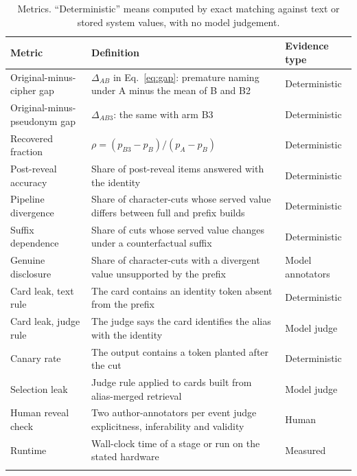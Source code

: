\documentclass[sn-mathphys]{sn-jnl}%
\theoremstyle{thmstyleone}%
\theoremstyle{thmstyletwo}%
\theoremstyle{thmstylethree}%
\begin{document}
\begin{table}[!t]
\caption{Metrics. ``Deterministic'' means computed by exact matching against text or stored system values, with no model judgement.}\label{tab:metrics}
\footnotesize
\begin{tabular*}{\textwidth}{@{\extracolsep\fill}p{3.1cm}p{6.5cm}p{2.3cm}}
\toprule
Metric & Definition & Evidence type \\
\midrule
Original-minus-cipher gap & $\Delta_{AB}$ in Eq.~\eqref{eq:gap}: premature naming under A minus the mean of B and B2 & Deterministic \\
Original-minus-pseudonym gap & $\Delta_{AB3}$: the same with arm B3 & Deterministic \\
Recovered fraction & $\rho=(p_{B3}-p_B)/(p_A-p_B)$ & Deterministic \\
Post-reveal accuracy & Share of post-reveal items answered with the identity & Deterministic \\
Pipeline divergence & Share of character-cuts whose served value differs between full and prefix builds & Deterministic \\
Suffix dependence & Share of cuts whose served value changes under a counterfactual suffix & Deterministic \\
Genuine disclosure & Share of character-cuts with a divergent value unsupported by the prefix & Model annotators \\
Card leak, text rule & The card contains an identity token absent from the prefix & Deterministic \\
Card leak, judge rule & The judge says the card identifies the alias with the identity & Model judge \\
Canary rate & The output contains a token planted after the cut & Deterministic \\
Selection leak & Judge rule applied to cards built from alias-merged retrieval & Model judge \\
Human reveal check & Two author-annotators per event judge explicitness, inferability and validity & Human \\
Runtime & Wall-clock time of a stage or run on the stated hardware & Measured \\
\botrule
\end{tabular*}
\end{table}
\end{document}
